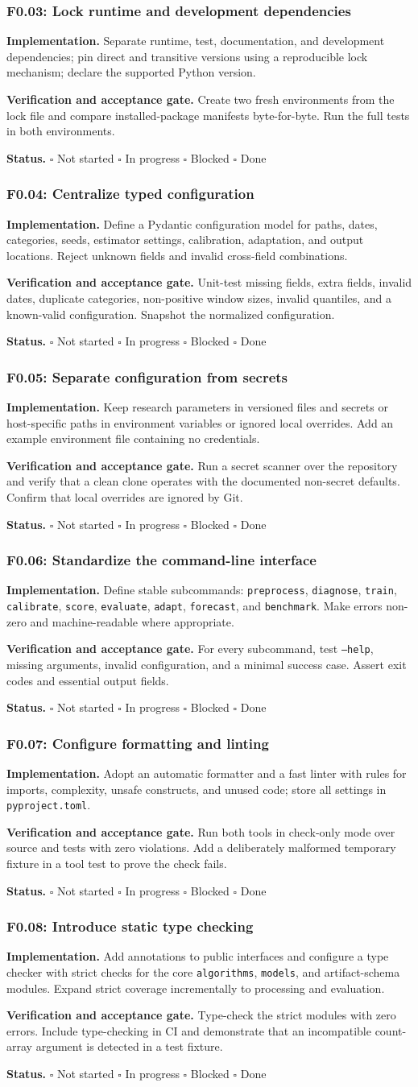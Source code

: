 \documentclass[11pt,a4paper]{article}
\newcommand{\status}{\(\square\) Not started \quad \(\square\) In progress \quad \(\square\) Blocked \quad \(\square\) Done}
\newcommand{\task}[4]{%
  \subsubsection{#1: #2}
  \textbf{Implementation.} #3

  \textbf{Verification and acceptance gate.} #4

  \textbf{Status.} \status
}
\newcommand{\artifact}[1]{\texttt{#1}}
\begin{document}
\task{F0.03}{Lock runtime and development dependencies}{Separate runtime, test, documentation, and development dependencies; pin direct and transitive versions using a reproducible lock mechanism; declare the supported Python version.}{Create two fresh environments from the lock file and compare installed-package manifests byte-for-byte. Run the full tests in both environments.}

\task{F0.04}{Centralize typed configuration}{Define a Pydantic configuration model for paths, dates, categories, seeds, estimator settings, calibration, adaptation, and output locations. Reject unknown fields and invalid cross-field combinations.}{Unit-test missing fields, extra fields, invalid dates, duplicate categories, non-positive window sizes, invalid quantiles, and a known-valid configuration. Snapshot the normalized configuration.}

\task{F0.05}{Separate configuration from secrets}{Keep research parameters in versioned files and secrets or host-specific paths in environment variables or ignored local overrides. Add an example environment file containing no credentials.}{Run a secret scanner over the repository and verify that a clean clone operates with the documented non-secret defaults. Confirm that local overrides are ignored by Git.}

\task{F0.06}{Standardize the command-line interface}{Define stable subcommands: \artifact{preprocess}, \artifact{diagnose}, \artifact{train}, \artifact{calibrate}, \artifact{score}, \artifact{evaluate}, \artifact{adapt}, \artifact{forecast}, and \artifact{benchmark}. Make errors non-zero and machine-readable where appropriate.}{For every subcommand, test \artifact{--help}, missing arguments, invalid configuration, and a minimal success case. Assert exit codes and essential output fields.}

\task{F0.07}{Configure formatting and linting}{Adopt an automatic formatter and a fast linter with rules for imports, complexity, unsafe constructs, and unused code; store all settings in \artifact{pyproject.toml}.}{Run both tools in check-only mode over source and tests with zero violations. Add a deliberately malformed temporary fixture in a tool test to prove the check fails.}

\task{F0.08}{Introduce static type checking}{Add annotations to public interfaces and configure a type checker with strict checks for the core \artifact{algorithms}, \artifact{models}, and artifact-schema modules. Expand strict coverage incrementally to processing and evaluation.}{Type-check the strict modules with zero errors. Include type-checking in CI and demonstrate that an incompatible count-array argument is detected in a test fixture.}
\end{document}
